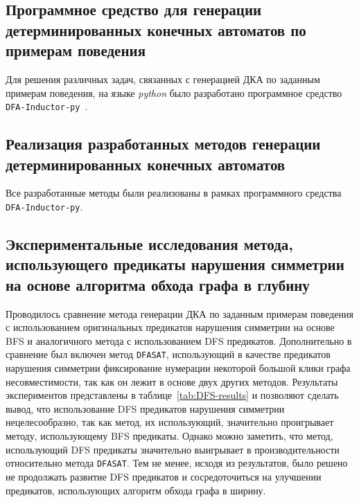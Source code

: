 
\subsection{Программное средство для генерации детерминированных конечных автоматов по примерам поведения}
\label{sec:space:results:dfa-inductor-py}

Для решения различных задач, связанных с генерацией ДКА по заданным примерам поведения, на языке \emph{python} было разработано программное средство \texttt{DFA-Inductor-py}~\cite{dfa-inductor-py}.


\subsection{Реализация разработанных методов генерации детерминированных конечных автоматов}
\label{sec:space:results:impl}

Все разработанные методы были реализованы в рамках программного средства \texttt{DFA-Inductor-py}.


\subsection{Экспериментальные исследования метода, использующего предикаты нарушения симметрии на основе алгоритма обхода графа в глубину}
\label{sec:space:results:dfs}

Проводилось сравнение метода генерации ДКА по заданным примерам поведения с использованием оригинальных предикатов нарушения симметрии на основе BFS и аналогичного метода с использованием DFS предикатов.
Дополнительно в сравнение был включен метод \texttt{DFASAT}, использующий в качестве предикатов нарушения симметрии фиксирование нумерации некоторой большой клики графа несовместимости, так как он лежит в основе двух других методов. 
Результаты экспериментов представлены в таблице~\ref{tab:DFS-results} и позволяют сделать вывод, что использование DFS предикатов нарушения симметрии нецелесообразно, так как метод, их использующий, значительно проигрывает методу, использующему BFS предикаты.
Однако можно заметить, что метод, использующий DFS предикаты значительно выигрывает в производительности относительно метода \texttt{DFASAT}.
Тем не менее, исходя из результатов, было решено не продолжать развитие DFS предикатов и сосредоточиться на улучшении предикатов, использующих алгоритм обхода графа в ширину.

